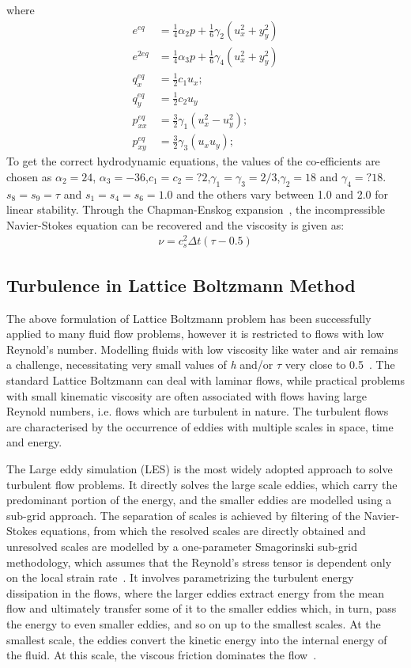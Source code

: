 \flushleft where
\begin{align}
e^{eq} & =\frac{1}{4}\alpha_2p+\frac{1}{6}\gamma_2(u_x^2+y_y^2)\\
e^{2eq} & =\frac{1}{4}\alpha_3p+\frac{1}{6}\gamma_4(u_x^2+y_y^2)\\
q_x^{eq} & =\frac{1}{2}c_1u_x;\\
q_y^{eq} & =\frac{1}{2}c_2u_y \\
p_{xx}^{eq} & =\frac{3}{2}\gamma_1(u_x^2 - u_y^2);\\
p_{xy}^{eq} & =\frac{3}{2}\gamma_3(u_xu_y);
\end{align}
To get the correct hydrodynamic equations, the values of the co-efficients are chosen as $\alpha_2=24$, $\alpha_3=-36$,$c_1=c_2=?2$,$\gamma_1=\gamma_3
=2/3$,$\gamma_2=18$ and $\gamma_4=?18$. $s_8 = s_9 = \tau$ and $s_1=s_4=s_6=1.0$ and the others vary between 1.0 and 2.0 for linear stability. Through the Chapman-Enskog expansion~\citep{Du2006}, the incompressible Navier-Stokes equation can be recovered and the viscosity is given as:
\begin{align}
\nu=c_s^2\Delta t(\tau-0.5)
\end{align}

\subsection{Turbulence in Lattice Boltzmann Method}
The above formulation of Lattice Boltzmann problem has been successfully applied to many fluid flow problems, however it is restricted to flows with low Reynold's number. Modelling fluids with low viscosity like water and air remains a challenge, necessitating very small values of \textit{h} and/or $\tau$ very close to 0.5~\citep{He1997}. The standard Lattice Boltzmann can deal with laminar flows, while practical problems with small kinematic viscosity are often associated with flows having large Reynold numbers, i.e. flows which are turbulent in nature. The turbulent flows are characterised by the occurrence of eddies with multiple scales in space, time and energy.

The Large eddy simulation (LES) is the most widely adopted approach to solve turbulent flow problems. It directly solves the large scale eddies, which carry the predominant portion of the energy, and the smaller eddies are modelled using a sub-grid approach. The separation of scales is achieved by filtering of the Navier-Stokes equations, from which the resolved scales are directly obtained and unresolved scales are modelled by a one-parameter Smagorinski sub-grid methodology, which assumes that the Reynold's stress tensor is dependent only on the local strain rate~\citep{Smagorinsky1963}. It involves parametrizing the turbulent energy dissipation in the flows, where the larger eddies extract energy from the mean flow and ultimately transfer some of it to the smaller eddies which, in turn, pass the energy to even smaller eddies, and so on up to the smallest scales. At the smallest scale, the eddies convert the kinetic energy into the internal energy of the fluid. At this scale, the viscous friction dominates the flow~\citep{Frisch1995}.


